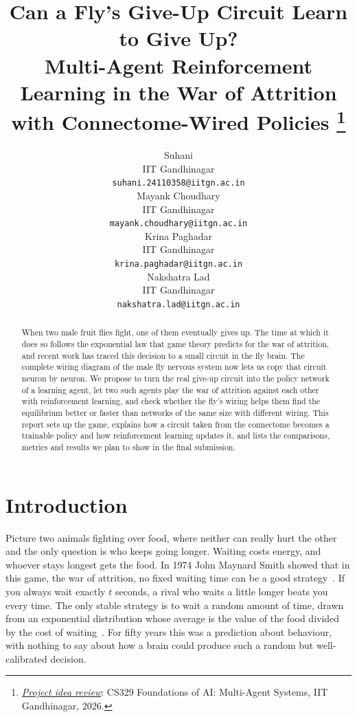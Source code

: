 \documentclass{article}
\title{Can a Fly's Give-Up Circuit Learn to Give Up?\\
Multi-Agent Reinforcement Learning in the War of Attrition with Connectome-Wired Policies
\thanks{\textit{\underline{Project idea review}}: CS329 Foundations of AI: Multi-Agent Systems, IIT Gandhinagar, 2026.}}
\author{
  Suhani \\
  IIT Gandhinagar \\
  \texttt{suhani.24110358@iitgn.ac.in} \\
  \And
  Mayank Choudhary \\
  IIT Gandhinagar \\
  \texttt{mayank.choudhary@iitgn.ac.in} \\
  \AND
  Krina Paghadar \\
  IIT Gandhinagar \\
  \texttt{krina.paghadar@iitgn.ac.in} \\
  \And
  Nakshatra Lad \\
  IIT Gandhinagar \\
  \texttt{nakshatra.lad@iitgn.ac.in} \\
}
\begin{document}
\maketitle

\begin{abstract}
When two male fruit flies fight, one of them eventually gives up. The time at which it does so follows the exponential law that game theory predicts for the war of attrition, and recent work has traced this decision to a small circuit in the fly brain. The complete wiring diagram of the male fly nervous system now lets us copy that circuit neuron by neuron. We propose to turn the real give-up circuit into the policy network of a learning agent, let two such agents play the war of attrition against each other with reinforcement learning, and check whether the fly's wiring helps them find the equilibrium better or faster than networks of the same size with different wiring. This report sets up the game, explains how a circuit taken from the connectome becomes a trainable policy and how reinforcement learning updates it, and lists the comparisons, metrics and results we plan to show in the final submission.
\end{abstract}


\section{Introduction}
\label{sec:intro}

Picture two animals fighting over food, where neither can really hurt the other and the only question is who keeps going longer. Waiting costs energy, and whoever stays longest gets the food. In 1974 John Maynard Smith showed that in this game, the war of attrition, no fixed waiting time can be a good strategy~\cite{maynardsmith1974}. If you always wait exactly $t$ seconds, a rival who waits a little longer beats you every time. The only stable strategy is to wait a random amount of time, drawn from an exponential distribution whose average is the value of the food divided by the cost of waiting~\cite{maynardsmith1974, bishop1978}. For fifty years this was a prediction about behaviour, with nothing to say about how a brain could produce such a random but well-calibrated decision.
\end{document}
